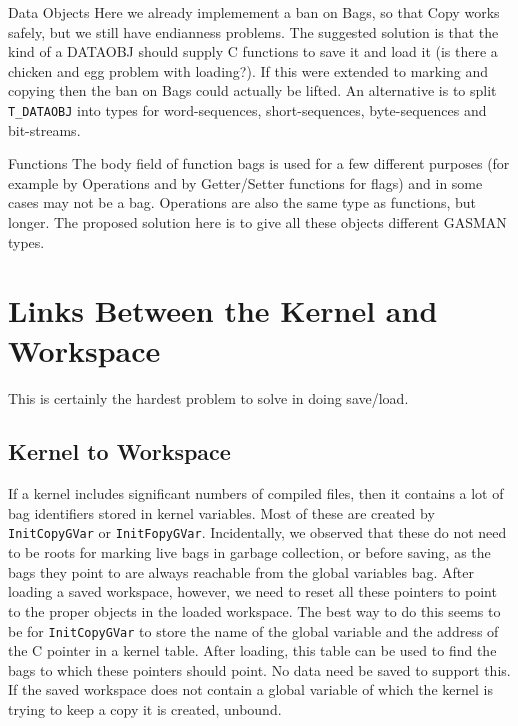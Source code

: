 \documentclass[11pt]{article}
\begin{document}
\begin{description}
\item{Data  Objects} Here we already implemement a ban on Bags,
so that Copy works safely, but we still have endianness problems. The
suggested solution is that the kind of a DATAOBJ should supply C
functions to save it and load it (is there a chicken and egg problem
with loading?). If this were extended to marking and copying then the
ban on Bags could actually be lifted. An alternative is to split
\verb|T_DATAOBJ| into types for word-sequences, short-sequences,
byte-sequences and bit-streams.
\item{Functions} The body field of function bags is used for a few
different purposes (for example by Operations and by Getter/Setter
functions for flags) and in some cases may not be a bag. Operations
are also the same type as functions, but longer. The proposed solution
here is to give all these objects different GASMAN types.
\end{description}

\section{Links Between the Kernel and Workspace}

This is certainly the hardest problem to solve in doing save/load.

\subsection{Kernel to Workspace}

If a kernel includes significant numbers of compiled files, then it
contains a lot of bag identifiers stored in kernel variables. Most of
these are created by \verb|InitCopyGVar| or
\verb|InitFopyGVar|. Incidentally, we
observed that these do not need to be roots for marking live bags in
garbage collection, or before saving, as the bags they point to are
always reachable from the global variables bag. After loading a saved
workspace, however, we need to reset all these pointers to point to
the proper objects in the loaded workspace.  The best way to do this
seems to be for \verb|InitCopyGVar| to store the name of the global
variable and the address of the C pointer in a kernel table. After
loading, this table can be used to find the bags to which these
pointers should point. No data need be saved to support this. If the
saved workspace does not contain a global variable of which the kernel
is trying to keep a copy it is created, unbound.
\end{document}
